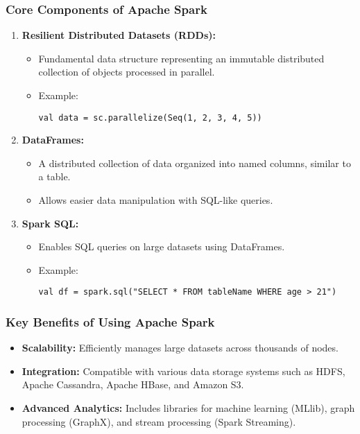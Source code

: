 \documentclass[aspectratio=169]{beamer}
\begin{document}
\begin{frame}[fragile]
    \frametitle{Core Components of Apache Spark}
    \begin{enumerate}
        \item \textbf{Resilient Distributed Datasets (RDDs):}
            \begin{itemize}
                \item Fundamental data structure representing an immutable distributed collection of objects processed in parallel.
                \item Example: \begin{lstlisting}
val data = sc.parallelize(Seq(1, 2, 3, 4, 5))
                \end{lstlisting}
            \end{itemize}
        
        \item \textbf{DataFrames:}
            \begin{itemize}
                \item A distributed collection of data organized into named columns, similar to a table.
                \item Allows easier data manipulation with SQL-like queries.
            \end{itemize}
        
        \item \textbf{Spark SQL:}
            \begin{itemize}
                \item Enables SQL queries on large datasets using DataFrames.
                \item Example: \begin{lstlisting}
val df = spark.sql("SELECT * FROM tableName WHERE age > 21")
                \end{lstlisting}
            \end{itemize}
    \end{enumerate}
\end{frame}

\begin{frame}[fragile]
    \frametitle{Key Benefits of Using Apache Spark}
    \begin{itemize}
        \item \textbf{Scalability:} Efficiently manages large datasets across thousands of nodes.
        \item \textbf{Integration:} Compatible with various data storage systems such as HDFS, Apache Cassandra, Apache HBase, and Amazon S3.
        \item \textbf{Advanced Analytics:} Includes libraries for machine learning (MLlib), graph processing (GraphX), and stream processing (Spark Streaming).
    \end{itemize}
\end{frame}
\end{document}
